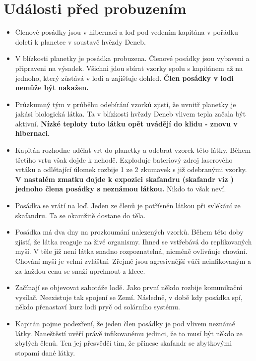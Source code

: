\documentclass[11pt,oneside,a4paper]{article}
\begin{document}
\section{\texorpdfstring{Události před probuzením}{Udalosti pred probuzenim}}
\label{sec:udalosti_pred_probuzenim}

\begin{itemize}
\item Členové posádky jsou v hibernaci a loď pod vedením kapitána v pořádku doletí k planetce v soustavě hvězdy Deneb.
\item V blízkosti planetky je posádka probuzena. Členové posádky jsou vybaveni a připraveni na výsadek. Všichni jdou sbírat vzorky spolu s kapitánem až na jednoho, který zůstává v lodi a zajišťuje dohled. \textbf{Člen posádky v lodi nemůže být nakažen.}
\item Průzkumný tým v průběhu odebírání vzorků zjistí, že uvnitř planetky je jakási biologická látka. Ta v blízkosti hvězdy Deneb vlivem tepla začala být aktivní. \textbf{Nízké teploty tuto látku opět uvádějí do klidu - znovu v hibernaci.}
\item Kapitán rozhodne udělat vrt do planetky a odebrat vzorek této látky. Během třetího vrtu však dojde k nehodě. Exploduje bateriový zdroj laserového vrtáku a odlétající úlomek rozbije 1 ze 2 zkumavek s již odebranými vzorky. \textbf{V nastalém zmatku dojde k expozici skafandru (skafandr viz ) jednoho člena posádky s neznámou látkou.} Nikdo to však neví.
\item Posádka se vrátí na loď. Jeden ze členů je potřísněn látkou při svlékání ze skafandru. Ta se okamžitě dostane do těla.
\item Posádka má dva dny na prozkoumání nalezených vzorků. Během této doby zjistí, že látka reaguje na živé organismy. Ihned se vstřebává do replikovaných myší. V těle již není látka snadno rozpoznatelná, nicméně ovlivňuje chování. Chování myší je velmi zvláštní. Zřejmě jsou agresivnější vůči neinfikovaným a za každou cenu se snaží uprchnout z klece.
\item Začínají se objevovat sabotáže lodě. Jako první někdo rozbije komunikační vysílač. Neexistuje tak spojení se Zemí. Následně, v době kdy posádka spí, někdo přenastaví kurz lodi pryč od solárního systému.
\item Kapitán pojme podezření, že jeden člen posádky je pod vlivem neznámé látky. Naneštěstí uvěří právě infikovanému jedinci, že to musí být někdo ze zbylých členů. Ten jej přesvědčí tím, že přinese skafandr se zbytkovými stopami dané látky.

\end{itemize}
\end{document}
